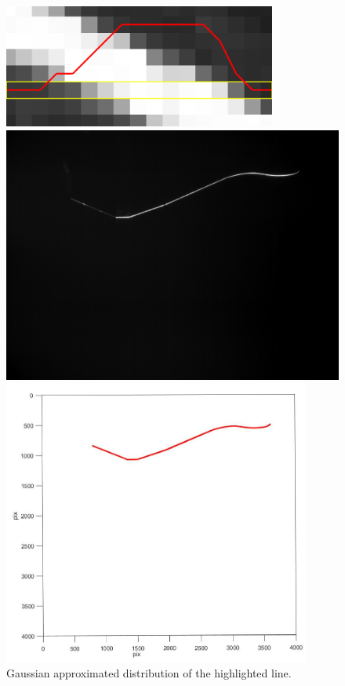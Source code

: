   \begin{figure}[t!]
    \centering
    \begin{minipage}{\textwidth}
      \centering
      \includegraphics[width=0.8\textwidth]{./images/tech/laser_prof.png}
      \caption{Gaussian approximated distribution of the highlighted line.}
      \label{fig:tech:laser-prof}
    \end{minipage}
    \vfill
    \begin{minipage}{0.49\textwidth}
      \centering
      \includegraphics[width=\textwidth]{./images/tech/C0_p240_SD.png}
    \end{minipage}
    \hfill
    \begin{minipage}{0.49\textwidth}
      \centering
      \includegraphics[width=0.9\textwidth]{./images/tech/profile_ex.jpg}

\end{minipage}
\end{figure}
